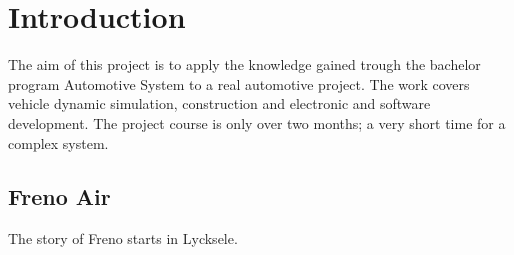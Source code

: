 \chapter{Introduction} 

The aim of this project is to apply the knowledge gained trough the bachelor program Automotive System to a real automotive project.
The work covers vehicle dynamic simulation, construction and electronic and software development.
The project course is only over two months; a very short time for a complex system.

\section{Freno Air}
The story of Freno starts in Lycksele.
